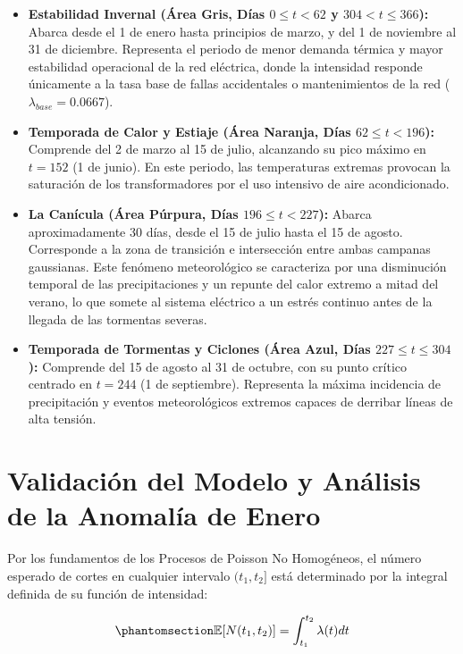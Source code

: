 \documentclass[
  spanish,
  letterpaper,
  DIV=11,
  numbers=noendperiod]{scrreprt}
\providecommand{\tightlist}{%
  \setlength{\itemsep}{0pt}\setlength{\parskip}{0pt}}
\theoremstyle{plain}
\theoremstyle{plain}
\theoremstyle{plain}
\theoremstyle{definition}
\theoremstyle{remark}
\begin{document}
\begin{itemize}
\tightlist
\item
  \textbf{Estabilidad Invernal (Área Gris, Días \(0 \le t < 62\) y
  \(304 < t \le 366\)):} Abarca desde el 1 de enero hasta principios de
  marzo, y del 1 de noviembre al 31 de diciembre. Representa el periodo
  de menor demanda térmica y mayor estabilidad operacional de la red
  eléctrica, donde la intensidad responde únicamente a la tasa base de
  fallas accidentales o mantenimientos de la red
  (\(\lambda_{base} = 0.0667\)).
\item
  \textbf{Temporada de Calor y Estiaje (Área Naranja, Días
  \(62 \le t < 196\)):} Comprende del 2 de marzo al 15 de julio,
  alcanzando su pico máximo en \(t = 152\) (1 de junio). En este
  periodo, las temperaturas extremas provocan la saturación de los
  transformadores por el uso intensivo de aire acondicionado.
\item
  \textbf{La Canícula (Área Púrpura, Días \(196 \le t < 227\)):} Abarca
  aproximadamente 30 días, desde el 15 de julio hasta el 15 de agosto.
  Corresponde a la zona de transición e intersección entre ambas
  campanas gaussianas. Este fenómeno meteorológico se caracteriza por
  una disminución temporal de las precipitaciones y un repunte del calor
  extremo a mitad del verano, lo que somete al sistema eléctrico a un
  estrés continuo antes de la llegada de las tormentas severas.
\item
  \textbf{Temporada de Tormentas y Ciclones (Área Azul, Días
  \(227 \le t \le 304\)):} Comprende del 15 de agosto al 31 de octubre,
  con su punto crítico centrado en \(t = 244\) (1 de septiembre).
  Representa la máxima incidencia de precipitación y eventos
  meteorológicos extremos capaces de derribar líneas de alta tensión.
\end{itemize}

\section{Validación del Modelo y Análisis de la Anomalía de
Enero}\label{validaciuxf3n-del-modelo-y-anuxe1lisis-de-la-anomaluxeda-de-enero}

Por los fundamentos de los Procesos de Poisson No Homogéneos, el número
esperado de cortes en cualquier intervalo \((t_1, t_2]\) está
determinado por la integral definida de su función de intensidad:

\begin{equation}\phantomsection\label{eq-integral-poisson}{
\mathbb{E}[N(t_1, t_2)] = \int_{t_1}^{t_2} \lambda(t) dt
}\end{equation}
\end{document}
